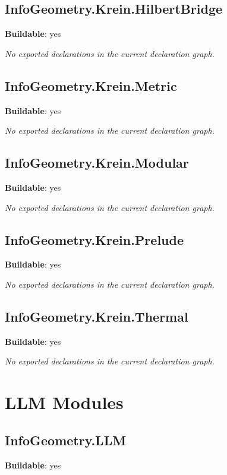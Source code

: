 \section{InfoGeometry.Krein.HilbertBridge}

\noindent\textbf{Buildable}: yes

\noindent\emph{No exported declarations in the current declaration graph.}

\section{InfoGeometry.Krein.Metric}

\noindent\textbf{Buildable}: yes

\noindent\emph{No exported declarations in the current declaration graph.}

\section{InfoGeometry.Krein.Modular}

\noindent\textbf{Buildable}: yes

\noindent\emph{No exported declarations in the current declaration graph.}

\section{InfoGeometry.Krein.Prelude}

\noindent\textbf{Buildable}: yes

\noindent\emph{No exported declarations in the current declaration graph.}

\section{InfoGeometry.Krein.Thermal}

\noindent\textbf{Buildable}: yes

\noindent\emph{No exported declarations in the current declaration graph.}

\chapter{LLM Modules}

\section{InfoGeometry.LLM}

\noindent\textbf{Buildable}: yes

